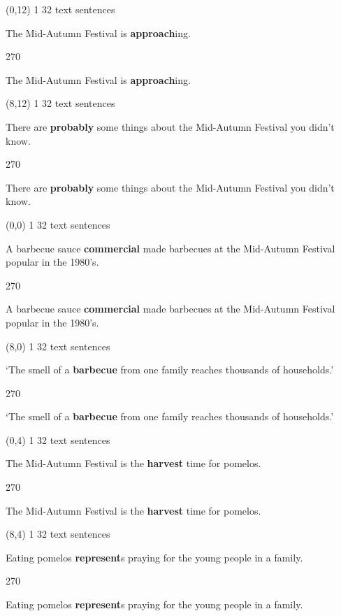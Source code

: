 \documentclass[a4paper]{article}
\newenvironment{itemize*}%
{\begin{itemize}%
 \setlength{\itemsep}{0.5cm}%
 \setlength{\parsep}{0pt}%
 \setlength{\parskip}{0pt}}%
{\end{itemize}}
\newcommand{\mycard}[3]{%
	\small #1 #2
	\par
	\parbox[t][6.8cm][c]{9.5cm}{%
	\par
	\myleft{#3}
	\par
	\myright{#3}
	}
}
\newcommand{\myleft}[1]{%
	\begin{sideways}
	\hspace*{-0.9cm}
		\parbox[t][2.7cm][t]{6.5cm}{%
		\large #1
		}
	\end{sideways}
}
\newcommand{\myright}[1]{%
	\hspace*{6.5cm}
	\begin{turn}{270}
	\hspace*{-7.1cm}
		\parbox[t][2.7cm][t]{6.5cm}{%
		\large #1
		}
	\end{turn}
}
\begin{document}
\begin{textblock}{8}(0,12)
\mycard{1}{32 text sentences}{
\begin{itemize*}
\item The Mid-Autumn Festival is \textbf{approach}ing.
\end{itemize*}
}
\end{textblock}

\begin{textblock}{8}(8,12)
\mycard{1}{32 text sentences}{
\begin{itemize*}
\item There are \textbf{probably} some things about the Mid-Autumn Festival you didn't know.
\end{itemize*}
}
\end{textblock}

\null
\newpage

\begin{textblock}{8}(0,0)
\mycard{1}{32 text sentences}{
\begin{itemize*}
\item A barbecue sauce \textbf{commercial} made barbecues at the Mid-Autumn Festival popular in the 1980's.
\end{itemize*}
}
\end{textblock}

\begin{textblock}{8}(8,0)
\mycard{1}{32 text sentences}{
\begin{itemize*}
\item `The smell of a \textbf{barbecue} from one family reaches thousands of households.'
\end{itemize*}
}
\end{textblock}

\begin{textblock}{8}(0,4)
\mycard{1}{32 text sentences}{
\begin{itemize*}
\item The Mid-Autumn Festival is the \textbf{harvest} time for pomelos.
\end{itemize*}
}
\end{textblock}

\begin{textblock}{8}(8,4)
\mycard{1}{32 text sentences}{
\begin{itemize*}
\item Eating pomelos \textbf{represent}s praying for the young people in a family.
\end{itemize*}
}
\end{textblock}
\end{document}
